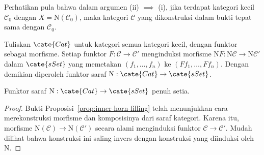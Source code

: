 Perhatikan pula bahwa dalam argumen (ii) $\implies$ (i), jika terdapat
kategori kecil $\mathcal{C}_0$ dengan $X=\mathrm{N}(\mathcal{C}_0)$, maka
kategori $\mathcal{C}$ yang dikonstruksi dalam bukti tepat sama dengan
$\mathcal{C}_0$.

Tuliskan $\cate{Cat}$ untuk kategori semua kategori kecil, dengan funktor
sebagai morfisme. Setiap funktor $F:\mathcal{C}\to\mathcal{C}'$ menginduksi
morfisme $\mathrm{N}F:\mathrm{N}\mathcal{C}\to
\mathrm{N}\mathcal{C}'$ dalam $\cate{sSet}$ yang memetakan
$(f_1,\ldots,f_n)$ ke $(Ff_1,\ldots,Ff_n)$. Dengan demikian diperoleh funktor
saraf $\mathrm{N}:\cate{Cat}\to\cate{sSet}$.

\begin{proposition}\label{prop:nerve-ff}
	Funktor saraf $\mathrm{N}:\cate{Cat}\to\cate{sSet}$ penuh setia.
\end{proposition}
\begin{proof}
	Bukti Proposisi~\ref{prop:inner-horn-filling} telah menunjukkan cara
	merekonstruksi morfisme dan komposisinya dari saraf kategori. Karena itu,
	morfisme $\mathrm{N}(\mathcal{C})\to\mathrm{N}(\mathcal{C}')$ secara alami
	menginduksi funktor $\mathcal{C}\to\mathcal{C}'$. Mudah dilihat bahwa
	konstruksi ini saling invers dengan konstruksi yang diinduksi oleh $\mathrm{N}$.
\end{proof}

